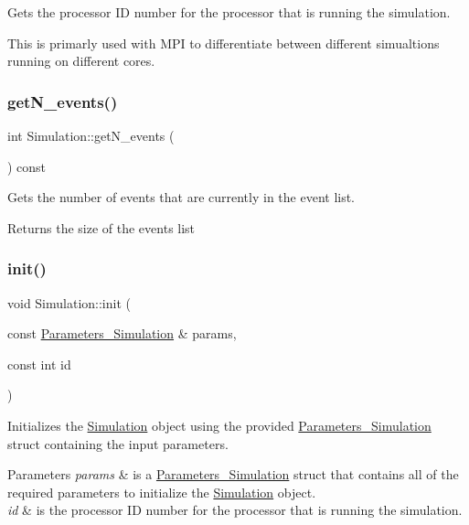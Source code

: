 Gets the processor ID number for the processor that is running the simulation. 

This is primarly used with M\+PI to differentiate between different simualtions running on different cores. \mbox{\label{class_simulation_a7d88f18a1ba988d7e77b8be8de5b10d1}} 
\subsubsection{\texorpdfstring{get\+N\+\_\+events()}{getN\_events()}}
{\footnotesize\ttfamily int Simulation\+::get\+N\+\_\+events (\begin{DoxyParamCaption}{ }\end{DoxyParamCaption}) const}



Gets the number of events that are currently in the event list. 

\begin{DoxyReturn}{Returns}
the size of the events list 
\end{DoxyReturn}
\mbox{\label{class_simulation_af88e5e0634b373ba28f1dd87670725a6}} 
\subsubsection{\texorpdfstring{init()}{init()}}
{\footnotesize\ttfamily void Simulation\+::init (\begin{DoxyParamCaption}\item[{const \hyperlink{struct_parameters___simulation}{Parameters\+\_\+\+Simulation} \&}]{params,  }\item[{const int}]{id }\end{DoxyParamCaption})}



Initializes the \hyperlink{class_simulation}{Simulation} object using the provided \hyperlink{struct_parameters___simulation}{Parameters\+\_\+\+Simulation} struct containing the input parameters. 


\begin{DoxyParams}{Parameters}
{\em params} & is a \hyperlink{struct_parameters___simulation}{Parameters\+\_\+\+Simulation} struct that contains all of the required parameters to initialize the \hyperlink{class_simulation}{Simulation} object. \\
\hline
{\em id} & is the processor ID number for the processor that is running the simulation. \\
\hline
\end{DoxyParams}
\mbox{\label{class_simulation_ac7c8a49a4cc506b850891480e0aae512}} 
